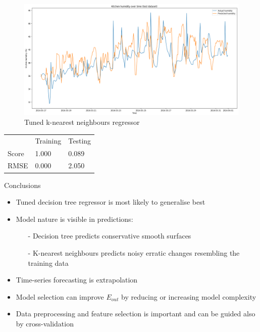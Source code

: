 \documentclass[9.5pt]{beamer}
\begin{document}
    \begin{frame}{}
        \bigskip
        \begin{figure}
            \centering
            \includegraphics[width=\linewidth]{images/tuned_k}
            \caption{Tuned k-nearest neighbours regressor}
        \end{figure}
        \small
        \begin{table}
            \begin{tabular}{l l l}
                & Training & Testing \\
                Score & 1.000    & 0.089   \\
                RMSE  & 0.000    & 2.050
            \end{tabular}
        \end{table}
    \end{frame}

    \begin{frame}{Conclusions}
        \begin{itemize}
            \item Tuned decision tree regressor is most likely to generalise best

            \item Model nature is visible in predictions:
            \begin{itemize}
                \item[-] Decision tree predicts conservative smooth surfaces
                \item[-] K-nearest neighbours predicts noisy erratic changes resembling the training data
            \end{itemize}

            \item Time-series forecasting is extrapolation

            \item Model selection can improve $E_{out}$ by reducing or increasing model complexity

            \item Data preprocessing and feature selection is important and can be guided also by cross-validation
        \end{itemize}
    \end{frame}
\end{document}
